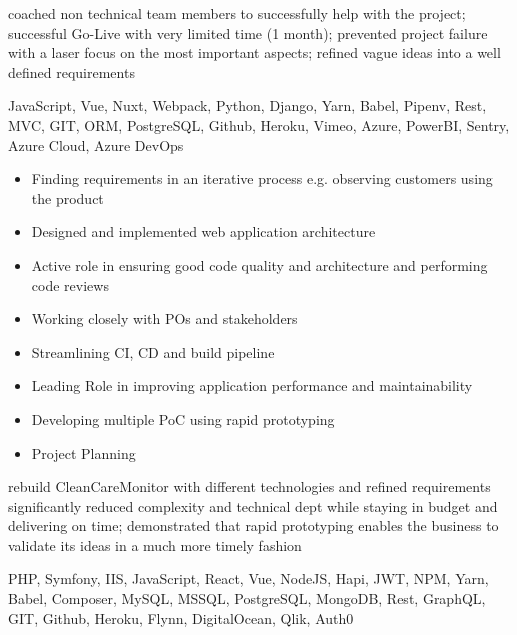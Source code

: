 \documentclass[9pt,a4paper]{altacv}
\begin{document}
coached non technical team members to successfully help with the project;
successful Go-Live with very limited time (1 month);
prevented project failure with a laser focus on the most important aspects;
refined vague ideas into a well defined requirements

JavaScript, Vue, Nuxt, Webpack, Python, Django, Yarn, Babel, Pipenv,
Rest, MVC, GIT, ORM, PostgreSQL, Github, Heroku, Vimeo, Azure, PowerBI, Sentry, Azure Cloud, Azure DevOps

\newpage
{}%

%

\begin{itemize}
\item Finding requirements in an iterative process e.g. observing customers using the product
\item Designed and implemented web application architecture
\item Active role in ensuring good code quality and architecture and performing code reviews
\item Working closely with POs and stakeholders
\item Streamlining CI, CD and build pipeline
\item Leading Role in improving application performance and maintainability
\item Developing multiple PoC using rapid prototyping
\item Project Planning

\end{itemize}

rebuild CleanCareMonitor with different technologies and refined requirements significantly reduced complexity and technical dept while staying in budget and delivering on time;
demonstrated that rapid prototyping enables the business to validate its ideas in a much more timely fashion

PHP, Symfony, IIS,
JavaScript, React, Vue, NodeJS, Hapi, JWT, NPM, Yarn, Babel, Composer,
MySQL, MSSQL, PostgreSQL, MongoDB, Rest, GraphQL,
GIT, Github, Heroku, Flynn, DigitalOcean, Qlik, Auth0
\end{document}
